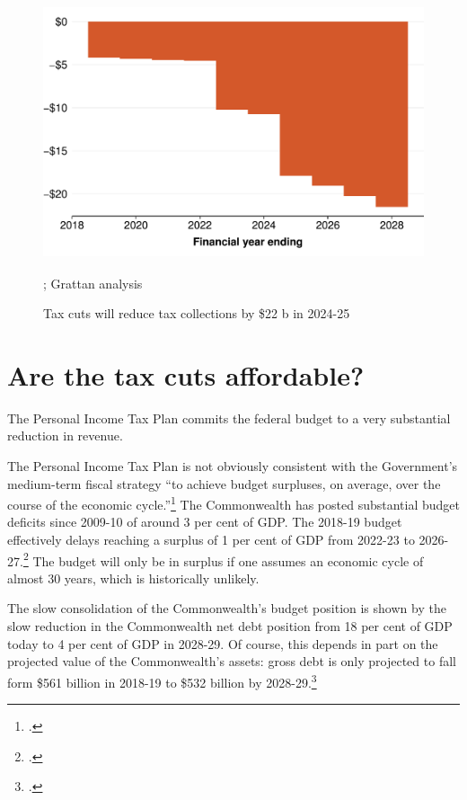 \documentclass[submission]{grattan}
\newenvironment{knitrout}{}{} %
\begin{document}
\begin{figure}
\caption{Tax cuts will reduce tax collections by \$22 b in 2024-25}\label{fig:1}
\begin{knitrout}
\color{fgcolor}
\includegraphics[width=4.47222in,height=2.92631723826715in]{atlas/fig1-1} 

\end{knitrout}


%
{\textcite{ATO2018}; Grattan analysis}
\end{figure}

\chapter{Are the tax cuts affordable? }\label{chap:are-the-tax-cuts-affordable}

The Personal Income Tax Plan commits the federal budget to a very substantial reduction in revenue.

The Personal Income Tax Plan is not obviously consistent with the Government's medium-term fiscal strategy ``to achieve budget surpluses, on average, over the course of the economic cycle.''\footcite[][3--7]{Treasury2018a}
The Commonwealth has posted substantial budget deficits since 2009-10 of around 3 per cent of GDP\@.
The 2018-19 budget effectively delays reaching a surplus of 1 per cent of GDP from 2022-23 to 2026-27.\footcite[][3--15]{Treasury2018a}
The budget will only be in surplus if one assumes an economic cycle of almost 30 years, which is historically unlikely.

The slow consolidation of the Commonwealth's budget position is shown by the slow reduction in the Commonwealth net debt position from 18 per cent of GDP today to 4 per cent of GDP in 2028-29. Of course, this depends in part on the projected value of the Commonwealth's assets: gross debt is only projected to fall form \$561 billion in 2018-19 to \$532 billion by 2028-29.\footcite[][3--16]{Treasury2018a}
\end{document}
